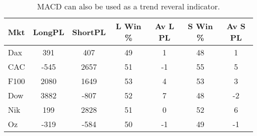 \begin{table}[ht]
\centering
\caption[MACD as Trend Reversal Indicator]{MACD can also be used as a trend reveral indicator.} 
\label{tab:mac_ob_results}
\begin{tabular}{lcccccc}
  \toprule Mkt & LongPL & ShortPL & L Win \% & Av L PL & S Win \% & Av S PL \\ 
  \midrule Dax & 391 & 407 & 49 & 1 & 48 & 1 \\ 
  CAC & -545 & 2657 & 51 & -1 & 55 & 5 \\ 
  F100 & 2080 & 1649 & 53 & 4 & 53 & 3 \\ 
  Dow & 3882 & -807 & 52 & 7 & 48 & -2 \\ 
  Nik & 199 & 2828 & 51 & 0 & 52 & 6 \\ 
  Oz & -319 & -584 & 50 & -1 & 49 & -1 \\ 
   \bottomrule \end{tabular}
\end{table}
